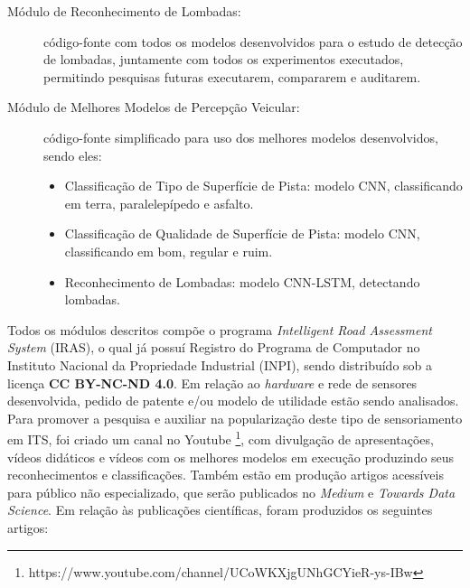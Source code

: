 \begin{small}
\begin{description}
    \item[Módulo de Reconhecimento de Lombadas:] código-fonte com todos os modelos desenvolvidos para o estudo de detecção de lombadas, juntamente com todos os experimentos executados, permitindo pesquisas futuras executarem, compararem e auditarem.
    
    \item[Módulo de Melhores Modelos de Percepção Veicular:] código-fonte simplificado para uso dos melhores modelos desenvolvidos, sendo eles:
    \begin{itemize}
        \item Classificação de Tipo de Superfície de Pista: modelo CNN, classificando em terra, paralelepípedo e asfalto.
        \item Classificação de Qualidade de Superfície de Pista: modelo CNN, classificando em bom, regular e ruim.
        \item Reconhecimento de Lombadas: modelo CNN-LSTM, detectando lombadas.
    \end{itemize}

\end{description}
\end{small}

Todos os módulos descritos compõe o programa \textit{Intelligent Road Assessment System} (IRAS), o qual já possuí Registro do Programa de Computador no Instituto Nacional da Propriedade Industrial (INPI), sendo distribuído sob a licença \textbf{CC BY-NC-ND 4.0}. Em relação ao \textit{hardware} e rede de sensores desenvolvida, pedido de patente e/ou modelo de utilidade estão sendo analisados. Para promover a pesquisa e auxiliar na popularização deste tipo de sensoriamento em ITS, foi criado um canal no Youtube \footnote{https://www.youtube.com/channel/UCoWKXjgUNhGCYieR-ys-IBw}, com divulgação de apresentações, vídeos didáticos e vídeos com os melhores modelos em execução produzindo seus reconhecimentos e classificações. Também estão em produção artigos acessíveis para público não especializado, que serão publicados no \textit{Medium} e \textit{Towards Data Science}. Em relação às publicações científicas, foram produzidos os seguintes artigos: 


